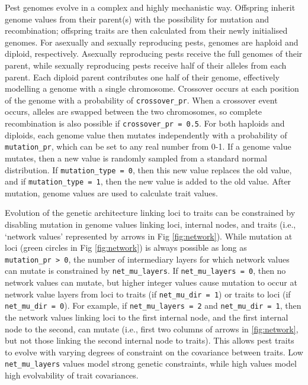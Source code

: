 \documentclass[10pt,letterpaper]{article}
\begin{document}
Pest genomes evolve in a complex and highly mechanistic way.
Offspring inherit genome values from their parent(s) with the possibility for mutation and recombination; offspring traits are then calculated from their newly initialised genomes.
For asexually and sexually reproducing pests, genomes are haploid and diploid, respectively.
Asexually reproducing pests receive the full genomes of their parent, while sexually reproducing pests receive half of their alleles from each parent.
Each diploid parent contributes one half of their genome, effectively modelling a genome with a single chromosome.
Crossover occurs at each position of the genome with a probability of \texttt{crossover\_pr}.
When a crossover event occurs, alleles are swapped between the two chromosomes, so complete recombination is also possible if \texttt{crossover\_pr\ =\ 0.5}.
For both haploids and diploids, each genome value then mutates independently with a probability of \texttt{mutation\_pr}, which can be set to any real number from 0-1.
If a genome value mutates, then a new value is randomly sampled from a standard normal distribution.
If \texttt{mutation\_type\ =\ 0}, then this new value replaces the old value, and if \texttt{mutation\_type\ =\ 1}, then the new value is added to the old value.
After mutation, genome values are used to calculate trait values.

Evolution of the genetic architecture linking loci to traits can be constrained by disabling mutation in genome values linking loci, internal nodes, and traits (i.e., `network values' represented by arrows in Fig \ref{fig:network}).
While mutation at loci (green circles in Fig \ref{fig:network}) is always possible as long as \texttt{mutation\_pr\ \textgreater{}\ 0}, the number of intermediary layers for which network values can mutate is constrained by \texttt{net\_mu\_layers}.
If \texttt{net\_mu\_layers\ =\ 0}, then no network values can mutate, but higher integer values cause mutation to occur at network value layers from loci to traits (if \texttt{net\_mu\_dir\ =\ 1}) or traits to loci (if \texttt{net\_mu\_dir\ =\ 0}).
For example, if \texttt{net\_mu\_layers\ =\ 2} and \texttt{net\_mu\_dir\ =\ 1}, then the network values linking loci to the first internal node, and the first internal node to the second, can mutate (i.e., first two columns of arrows in \ref{fig:network}, but not those linking the second internal node to traits).
This allows pest traits to evolve with varying degrees of constraint on the covariance between traits.
Low \texttt{net\_mu\_layers} values model strong genetic constraints, while high values model high evolvability of trait covariances.
\end{document}

